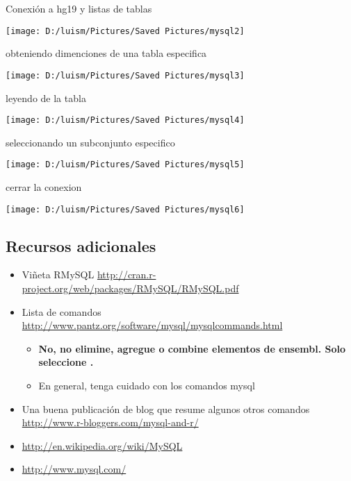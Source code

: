 \documentclass[
]{article}
\providecommand{\tightlist}{%
  \setlength{\itemsep}{0pt}\setlength{\parskip}{0pt}}
\begin{document}
Conexión a hg19 y listas de tablas

\begin{center}\texttt{[image: D:/luism/Pictures/Saved Pictures/mysql2]} \end{center}

obteniendo dimenciones de una tabla especifica

\begin{center}\texttt{[image: D:/luism/Pictures/Saved Pictures/mysql3]} \end{center}

leyendo de la tabla

\begin{center}\texttt{[image: D:/luism/Pictures/Saved Pictures/mysql4]} \end{center}

seleccionando un subconjunto especifico

\begin{center}\texttt{[image: D:/luism/Pictures/Saved Pictures/mysql5]} \end{center}

cerrar la conexion

\begin{center}\texttt{[image: D:/luism/Pictures/Saved Pictures/mysql6]} \end{center}

\hypertarget{recursos-adicionales}{%
\subsection{Recursos adicionales}\label{recursos-adicionales}}

\begin{itemize}
\tightlist
\item
  Viñeta RMySQL
  \url{http://cran.r-project.org/web/packages/RMySQL/RMySQL.pdf}
\item
  Lista de comandos
  \url{http://www.pantz.org/software/mysql/mysqlcommands.html}

  \begin{itemize}
  \tightlist
  \item
    \textbf{No, no elimine, agregue o combine elementos de ensembl. Solo
    seleccione .}
  \item
    En general, tenga cuidado con los comandos mysql
  \end{itemize}
\item
  Una buena publicación de blog que resume algunos otros comandos
  \url{http://www.r-bloggers.com/mysql-and-r/}
\item
  \url{http://en.wikipedia.org/wiki/MySQL}
\item
  \url{http://www.mysql.com/}
\end{itemize}
\end{document}
